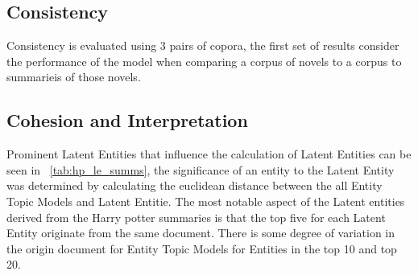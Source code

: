 \documentclass[10pt]{report}
\begin{document}
\begin{table}[h!]
  \caption{Entity Topic Models most strongly represented by each Entity Topic Model.\label{tab:hp_le_fulls}}
\end{table}
\renewcommand{\baselinestretch}{2.0}\normalsize
\renewcommand{\arraystretch}{1.0}


\clearpage
\subsection{Consistency}
Consistency is evaluated using 3 pairs of copora, the first set of results consider the performance of the model when comparing a corpus of novels to a corpus to summarieis of those novels. 

\clearpage
\subsection{Cohesion and Interpretation}

Prominent Latent Entities that influence the calculation of Latent Entities can be seen in ~\ref{tab:hp_le_summs}, the significance of an entity to the Latent Entity was determined by calculating the euclidean distance between the all Entity Topic Models and Latent Entitie. The most notable aspect of the Latent entities derived from the Harry potter summaries is that the top five for each Latent Entity originate from the same document. There is some degree of variation in the origin document for Entity Topic Models for Entities in the top 10 and top 20. 
\end{document}
